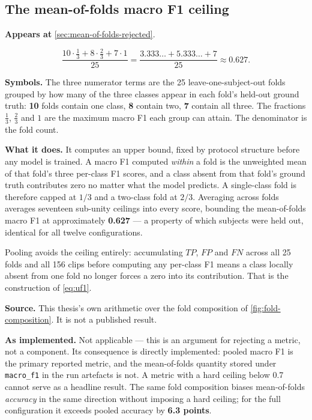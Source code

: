 \subsection{The mean-of-folds macro F1 ceiling}
\label{eq:fold-ceiling}

\textbf{Appears at} \autoref{sec:mean-of-folds-rejected}.

\[
	\frac{10 \cdot \tfrac13 + 8 \cdot \tfrac23 + 7 \cdot 1}{25} = \frac{3.333\ldots + 5.333\ldots + 7}{25} \approx 0.627.
\]

\textbf{Symbols.} The three numerator terms are the 25 leave-one-subject-out
folds grouped by how many of the three classes appear in each fold's held-out
ground truth: \textbf{10} folds contain one class, \textbf{8} contain two,
\textbf{7} contain all three. The fractions $\tfrac13$, $\tfrac23$ and $1$ are
the maximum macro F1 each group can attain. The denominator is the fold count.

\textbf{What it does.} It computes an upper bound, fixed by protocol
structure before any model is trained. A macro F1 computed \emph{within} a
fold is the unweighted mean of that fold's three per-class F1 scores, and a
class absent from that fold's ground truth contributes zero no matter what the
model predicts. A single-class fold is therefore capped at $1/3$ and a
two-class fold at $2/3$. Averaging across folds averages seventeen sub-unity
ceilings into every score, bounding the mean-of-folds macro F1 at
approximately \textbf{0.627} --- a property of which subjects were held out,
identical for all twelve configurations.

Pooling avoids the ceiling entirely: accumulating $TP$, $FP$ and $FN$ across
all 25 folds and all 156 clips before computing any per-class F1 means a class
locally absent from one fold no longer forces a zero into its contribution.
That is the construction of \autoref{eq:uf1}.

\textbf{Source.} This thesis's own arithmetic over the fold composition of
\autoref{fig:fold-composition}. It is not a published result.

\textbf{As implemented.} Not applicable --- this is an argument for rejecting
a metric, not a component. Its consequence is directly implemented: pooled
macro F1 is the primary reported metric, and the mean-of-folds quantity stored
under \texttt{macro\_f1} in the run artefacts is not. A metric with a hard
ceiling below 0.7 cannot serve as a headline result. The same fold composition
biases mean-of-folds \emph{accuracy} in the same direction without imposing a
hard ceiling; for the full configuration it exceeds pooled accuracy by
\textbf{6.3 points}.

